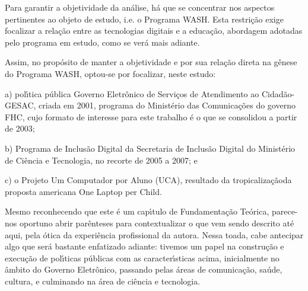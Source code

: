 \documentclass[
12pt,		%
openright,	%
twoside,  %
a4paper,			%
chapter=TITLE,		%
english,			%
french,				%
spanish,			%
brazil				%
]{USPSC-classe/USPSC}
\begin{document}
Para garantir a objetividade da an\'alise, h\'a que se concentrar nos aspectos pertinentes ao objeto de estudo, i.e. o Programa WASH. Esta restri\c{c}\~ao exige focalizar a rela\c{c}\~ao entre as tecnologias digitais e a educa\c{c}\~ao, abordagem adotadas pelo programa em estudo, como se ver\'a mais adiante.









Assim, no prop\'osito de manter a objetividade e por sua rela\c{c}\~ao direta na g\^enese do Programa WASH, optou-se por focalizar, neste estudo:










\begin{alineas}
\item a) pol\'{\i}tica p\'ublica \textquotedbl Governo Eletr\^onico de Servi\c{c}os de Atendimento ao Cidad\~ao-GESAC\textquotedbl , criada em 2001, programa do Minist\'erio das Comunica\c{c}\~oes do governo FHC, cujo formato de interesse para este trabalho \'e o que se consolidou a partir de 2003;

\item b) Programa de Inclus\~ao Digital da Secretaria de Inclus\~ao Digital do Minist\'erio de Ci\^encia e Tecnologia, no recorte de 2005 a 2007; e
\item c) o Projeto Um Computador por Aluno (UCA), resultado da \textquotedbl tropicaliza\c{c}\~ao\textquotedbl  da proposta americana \textquotedbl One Laptop per Child\textquotedbl .
\end{alineas}

Mesmo reconhecendo que este \'e um cap\'{\i}tulo de Fundamenta\c{c}\~ao Te\'orica, parece-nos oportuno abrir par\^enteses para contextualizar o que vem sendo descrito at\'e aqui, pela \'otica da experi\^encia profissional da autora. Nessa toada, cabe antecipar algo que ser\'a bastante enfatizado adiante: tivemos um papel na constru\c{c}\~ao e execu\c{c}\~ao de pol\'{\i}ticas p\'ublicas com as caracter\'{\i}sticas acima, inicialmente no \^ambito do Governo Eletr\^onico, passando pelas \'areas de comunica\c{c}\~ao, sa\'ude, cultura, e culminando na \'area de ci\^encia e tecnologia.
\end{document}
